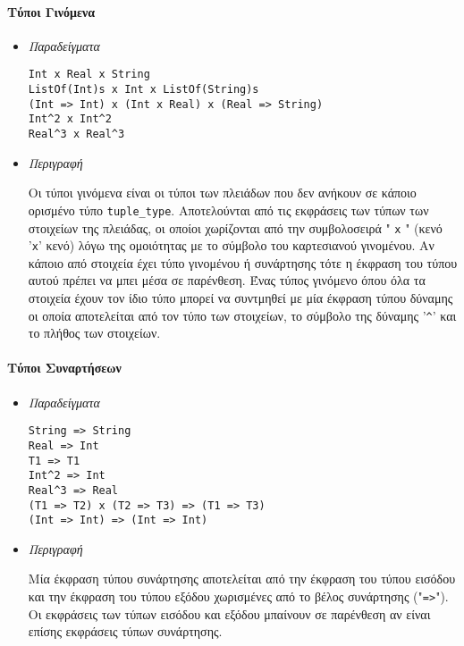 \documentclass[diploma]{softlab-thesis}
\begin{document}
\newpage

\paragraph{Τύποι Γινόμενα}

\begin{itemize}
\item \textit{Παραδείγματα}
\begin{verbatim}
Int x Real x String
ListOf(Int)s x Int x ListOf(String)s
(Int => Int) x (Int x Real) x (Real => String)
Int^2 x Int^2
Real^3 x Real^3
\end{verbatim}

\item \textit{Περιγραφή}

Οι τύποι γινόμενα είναι οι τύποι των πλειάδων που δεν ανήκουν σε κάποιο
ορισμένο τύπο \verb|tuple_type|. Αποτελούνται από τις εκφράσεις των τύπων των
στοιχείων της πλειάδας, οι οποίοι χωρίζονται από την συμβολοσειρά " \verb|x| "
(κενό '\verb|x|' κενό) λόγω της ομοιότητας με το σύμβολο του καρτεσιανού
γινομένου. Αν κάποιο από στοιχεία έχει τύπο γινομένου ή συνάρτησης τότε η
έκφραση του τύπου αυτού πρέπει να μπει μέσα σε παρένθεση. Ένας τύπος γινόμενο
όπου όλα τα στοιχεία έχουν τον ίδιο τύπο μπορεί να συντμηθεί με μία έκφραση
τύπου δύναμης οι οποία αποτελείται από τον τύπο των στοιχείων, το σύμβολο της
δύναμης '\verb|^|' και το πλήθος των στοιχείων.

\end{itemize}

\paragraph{Τύποι Συναρτήσεων}

\begin{itemize}
\item \textit{Παραδείγματα}
\begin{verbatim}
String => String
Real => Int
T1 => T1
Int^2 => Int
Real^3 => Real
(T1 => T2) x (T2 => T3) => (T1 => T3)
(Int => Int) => (Int => Int)
\end{verbatim}

\item \textit{Περιγραφή}

Μία έκφραση τύπου συνάρτησης αποτελείται από την έκφραση του τύπου εισόδου και
την έκφραση του τύπου εξόδου χωρισμένες από το βέλος συνάρτησης ("\verb|=>|").
Οι εκφράσεις των τύπων εισόδου και εξόδου μπαίνουν σε παρένθεση αν είναι
επίσης εκφράσεις τύπων συνάρτησης.

\end{itemize}
\end{document}
